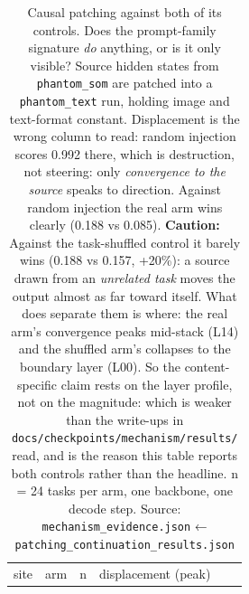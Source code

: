 \begin{table}[tp]
\centering
\caption{Causal patching against both of its controls. Does the prompt-family signature \emph{do} anything, or is it only visible? Source hidden states from \texttt{phantom\_som} are patched into a \texttt{phantom\_text} run, holding image and text-format constant. Displacement is the wrong column to read: random injection scores 0.992 there, which is destruction, not steering: only \emph{convergence to the source} speaks to direction. Against random injection the real arm wins clearly (0.188 vs 0.085). \textbf{Caution:} Against the task-shuffled control it barely wins (0.188 vs 0.157, +20\%): a source drawn from an \emph{unrelated task} moves the output almost as far toward itself. What does separate them is where: the real arm's convergence peaks mid-stack (L14) and the shuffled arm's collapses to the boundary layer (L00). So the content-specific claim rests on the layer profile, not on the magnitude: which is weaker than the write-ups in \texttt{docs/checkpoints/mechanism/results/} read, and is the reason this table reports both controls rather than the headline. n = 24 tasks per arm, one backbone, one decode step. Source: \texttt{mechanism\_evidence.json} ← \texttt{patching\_continuation\_results.json}}
\label{tab:t39}
\footnotesize
\setlength{\tabcolsep}{3pt}
\begin{tabular}{@{}
  >{\raggedright\arraybackslash}p{}
  >{\raggedright\arraybackslash}p{}
  >{\raggedright\arraybackslash}p{}
  >{\raggedright\arraybackslash}p{}
  >{\raggedright\arraybackslash}p{}
  >{\raggedright\arraybackslash}p{}@{}}
\toprule
\begin{minipage}[b]{\linewidth}\raggedright
site
\end{minipage} & \begin{minipage}[b]{\linewidth}\raggedright
arm
\end{minipage} & \begin{minipage}[b]{\linewidth}\raggedright
n
\end{minipage} & \begin{minipage}[b]{\linewidth}\raggedright
displacement (peak)
\end{minipage} & \begin{minipage}[b]{\linewidth}\raggedright

\end{minipage}
\end{tabular}
\end{table}
